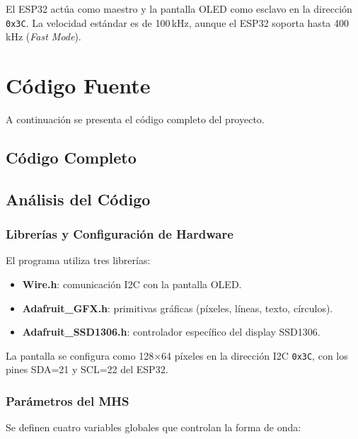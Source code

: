 \documentclass[12pt,a4paper]{article}
\begin{document}
El ESP32 actúa como maestro y la pantalla OLED como esclavo en la dirección \texttt{0x3C}. La velocidad estándar es de 100\,kHz, aunque el ESP32 soporta hasta 400\,kHz (\textit{Fast Mode}).

\section{Código Fuente}

A continuación se presenta el código completo del proyecto.

\subsection{Código Completo}


\subsection{Análisis del Código}

\subsubsection*{Librerías y Configuración de Hardware}

El programa utiliza tres librerías:
\begin{itemize}
    \item \textbf{Wire.h}: comunicación I2C con la pantalla OLED.
    \item \textbf{Adafruit\_GFX.h}: primitivas gráficas (píxeles, líneas, texto, círculos).
    \item \textbf{Adafruit\_SSD1306.h}: controlador específico del display SSD1306.
\end{itemize}

La pantalla se configura como 128$\times$64 píxeles en la dirección I2C \texttt{0x3C}, con los pines SDA=21 y SCL=22 del ESP32.

\subsubsection*{Parámetros del MHS}

Se definen cuatro variables globales que controlan la forma de onda:
\end{document}
